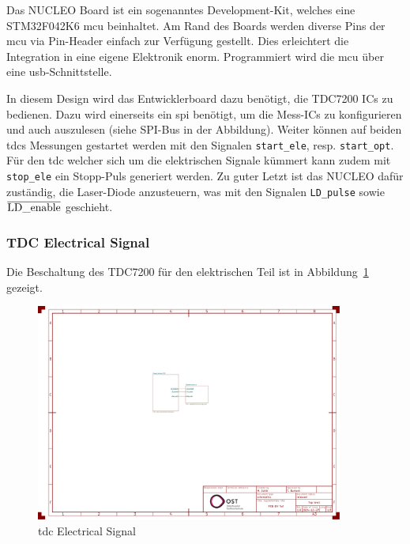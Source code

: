 Das NUCLEO Board ist ein sogenanntes \dq Development-Kit\dq, welches eine STM32F042K6 \acrshort{mcu}
beinhaltet. Am Rand des Boards werden diverse Pins der \acrfull{mcu} via Pin-Header
einfach zur Verfügung gestellt. Dies erleichtert die Integration in eine eigene Elektronik
enorm. Programmiert wird die \acrshort{mcu} über eine \acrshort{usb}-Schnittstelle.

In diesem Design wird das Entwicklerboard dazu benötigt, die TDC7200 ICs zu
bedienen. Dazu wird einerseits ein \acrfull{spi} benötigt, um die Mess-ICs zu konfigurieren
und auch auszulesen (siehe SPI-Bus in der Abbildung). Weiter können auf beiden \acrshort{tdc}s Messungen
gestartet werden mit den Signalen \lstinline|start_ele|, resp. \lstinline|start_opt|. Für den
\acrshort{tdc} welcher sich um die elektrischen Signale kümmert kann zudem mit \lstinline|stop_ele| ein
Stopp-Puls generiert werden.
Zu guter Letzt ist das NUCLEO dafür zuständig, die Laser-Diode anzusteuern, was mit den Signalen
\lstinline|LD_pulse| sowie $\overline{\mbox{\lstinline|LD_enable|}}$ geschieht.

\subsubsection{TDC Electrical Signal}

Die Beschaltung des TDC7200 \cite{ti2016tdc7200_datasheet} für den elektrischen Teil ist in
Abbildung~\ref{fig:tdc_ele_signal} gezeigt.

\begin{figure}[H]
    \centering
    \includegraphics[page=2, trim=80 330 750 310, clip, width=0.9\textwidth]{attachments/schematic.pdf}
    \caption{\acrshort{tdc} Electrical Signal}\label{fig:tdc_ele_signal}
\end{figure}

